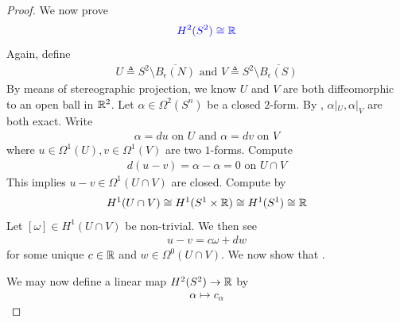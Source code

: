 \documentclass{report}
\begin{document}
\begin{proof}
We now prove 
\begin{align*}
\textcolor{blue}{H^2(S^2)\cong  \mathbb{R}}
\end{align*}
Again, define 
 \begin{align*}
 U \triangleq S^2 \setminus \overline{B_\epsilon (N)} \text{ and }V \triangleq S^2 \setminus \overline{B_\epsilon (S)}
 \end{align*}
By means of stereographic projection, we know $U$ and  $V$ are both diffeomorphic to an open ball in  $\mathbb{R}^2$. Let $\alpha \in \Omega^2(S^n)$ be a closed $2$-form. By , $\alpha |_U, \alpha |_V$ are both exact. Write 
\begin{align*}
\alpha = du \text{ on }U\text{ and }\alpha =dv\text{ on }V
\end{align*}
where $u\in \Omega^{1}(U),v \in \Omega^{1}(V)$ are two $1$-forms. Compute 
\begin{align*}
d(u-v)=\alpha -\alpha =0\text{ on }U\cap V
\end{align*}
This implies $u-v\in \Omega^{1}(U \cap V)$ are closed. Compute by  
\begin{align*}
H^{1}(U \cap V)\cong  H^{1}(S^{1}\times \mathbb{R})\cong  H^{1}(S^{1})\cong \mathbb{R}
\end{align*}
Let $[\omega]\in H^1(U \cap V)$ be non-trivial. We then see 
\begin{align*}
u-v=c \omega + dw 
\end{align*}
for some unique $c \in\mathbb{R}$ and $w\in \Omega^0(U \cap V)$. We now show that .   




We may now define a linear map $H^2(S^2)\rightarrow \mathbb{R}$ by 
\begin{align*}
\alpha \mapsto c_\alpha 
\end{align*}

\end{proof}
\end{document}
